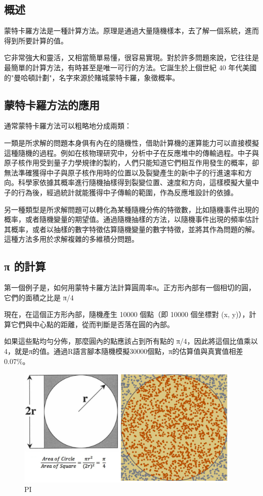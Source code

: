 \documentclass[10pt,UTF8]{ctexart}
\begin{document}
\subsection{概述}

蒙特卡羅方法是一種計算方法。原理是通過大量隨機樣本，去了解一個系統，進而得到所要計算的值。
 
它非常強大和靈活，又相當簡單易懂，很容易實現。對於許多問題來說，它往往是最簡單的計算方法，有時甚至是唯一可行的方法。它誕生於上個世紀 40 年代美國的"曼哈頓計劃"，名字來源於賭城蒙特卡羅，象徵概率。

\subsection{蒙特卡羅方法的應用}

通常蒙特卡羅方法可以粗略地分成兩類：

一類是所求解的問題本身俱有內在的隨機性，借助計算機的運算能力可以直接模擬這種隨機的過程。例如在核物理研究中，分析中子在反應堆中的傳輸過程。中子與原子核作用受到量子力學規律的製約，人們只能知道它們相互作用發生的概率，卻無法準確獲得中子與原子核作用時的位置以及裂變產生的新中子的行進速率和方向。科學家依據其概率進行隨機抽樣得到裂變位置、速度和方向，這樣模擬大量中子的行為後，經過統計就能獲得中子傳輸的範圍，作為反應堆設計的依據。

另一種類型是所求解問題可以轉化為某種隨機分佈的特徵數，比如隨機事件出現的概率，或者隨機變量的期望值。通過隨機抽樣的方法，以隨機事件出現的頻率估計其概率，或者以抽樣的數字特徵估算隨機變量的數字特徵，並將其作為問題的解。這種方法多用於求解複雜的多維積分問題。

\subsection{π 的計算}

第一個例子是，如何用蒙特卡羅方法計算圓周率π。正方形內部有一個相切的圓，它們的面積之比是 π/4

現在，在這個正方形內部，隨機產生 10000 個點（即 10000 個坐標對 (x, y)），計算它們與中心點的距離，從而判斷是否落在圓的內部。

如果這些點均勻分佈，那麼圓內的點應該占到所有點的 π/4，因此將這個比值乘以4，就是π的值。通過R語言腳本隨機模擬30000個點，π的估算值與真實值相差0.07\%。

\begin{figure}[H]
\centering 
\includegraphics[width=0.95\textwidth]{w15-lab-3.png} 
\caption{PI}
\label{Test}
\end{figure}
\end{document}
